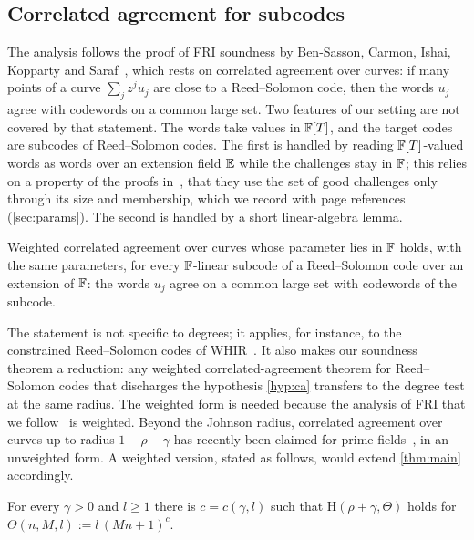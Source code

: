 \subsection{Correlated agreement for subcodes}\label{sec:intro-ca}

The analysis follows the proof of FRI soundness by Ben-Sasson, Carmon, Ishai, Kopparty and
Saraf~\cite{BCIKS20}, which rests on correlated agreement over curves: if many points of a
curve $\sum_jz^ju_j$ are close to a Reed--Solomon code, then the words $u_j$ agree with
codewords on a common large set. Two features of our setting are not covered by that
statement. The words take values in $\mathbb{F}[T]$, and the target codes are subcodes of
Reed--Solomon codes. The first is handled by reading $\mathbb{F}[T]$-valued words as words over an
extension field $\mathbb{E}$ while the challenges stay in $\mathbb{F}$; this relies on a property of the
proofs in~\cite{BCIKS20}, that they use the set of good challenges only through its size and
membership, which we record with page references (\cref{sec:params}). The second is handled
by a short linear-algebra lemma.

\begin{introthm}
Weighted correlated agreement over curves whose parameter lies in $\mathbb{F}$ holds, with the same
parameters, for every $\mathbb{F}$-linear subcode of a Reed--Solomon code over an extension of $\mathbb{F}$:
the words $u_j$ agree on a common large set with codewords of the subcode.
\end{introthm}

The statement is not specific to degrees; it applies, for instance, to the constrained
Reed--Solomon codes of WHIR~\cite{ACFY25}. It also makes our soundness theorem a reduction:
any weighted correlated-agreement theorem for Reed--Solomon codes that discharges the
hypothesis \cref{hyp:ca} transfers to the degree test at the same radius. The weighted form is
needed because the analysis of FRI that we follow~\cite[\S8]{BCIKS20} is weighted. Beyond the
Johnson radius, correlated agreement over curves up to radius $1-\rho-\gamma$ has recently
been claimed for prime fields~\cite{Jer26}, in an unweighted form. A weighted version, stated
as follows, would extend \cref{thm:main} accordingly.

\begin{conjecture}\label{conj:capacity}
For every $\gamma>0$ and $l\ge1$ there is $c=c(\gamma,l)$ such that
$\mathrm H(\rho+\gamma,\Theta)$ holds for $\Theta(n,M,l):=l\,(Mn+1)^c$.
\end{conjecture}

